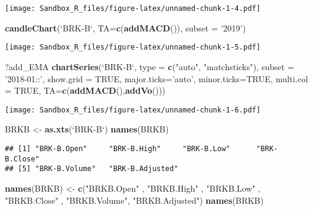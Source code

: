 \documentclass[]{article}
\newenvironment{Shaded}{\begin{snugshade}}{\end{snugshade}}
\newcommand{\KeywordTok}[1]{\textcolor[rgb]{0.13,0.29,0.53}{\textbf{#1}}}
\newcommand{\DataTypeTok}[1]{\textcolor[rgb]{0.13,0.29,0.53}{#1}}
\newcommand{\StringTok}[1]{\textcolor[rgb]{0.31,0.60,0.02}{#1}}
\newcommand{\OtherTok}[1]{\textcolor[rgb]{0.56,0.35,0.01}{#1}}
\newcommand{\NormalTok}[1]{#1}
\begin{document}
\texttt{[image: Sandbox\_R\_files/figure-latex/unnamed-chunk-1-4.pdf]}

\begin{Shaded}
\begin{Highlighting}[]
\KeywordTok{candleChart}\NormalTok{(}\StringTok{`}\DataTypeTok{BRK-B}\StringTok{`}\NormalTok{, }\DataTypeTok{TA=}\KeywordTok{c}\NormalTok{(}\KeywordTok{addMACD}\NormalTok{()), }\DataTypeTok{subset =} \StringTok{'2019'}\NormalTok{)}
\end{Highlighting}
\end{Shaded}

\texttt{[image: Sandbox\_R\_files/figure-latex/unnamed-chunk-1-5.pdf]}

\begin{Shaded}
\begin{Highlighting}[]
\NormalTok{?add_EMA}
\KeywordTok{chartSeries}\NormalTok{(}\StringTok{`}\DataTypeTok{BRK-B}\StringTok{`}\NormalTok{, }
            \DataTypeTok{type =} \KeywordTok{c}\NormalTok{(}\StringTok{"auto"}\NormalTok{, }\StringTok{"matchsticks"}\NormalTok{), }
            \DataTypeTok{subset =} \StringTok{'2018-01::'}\NormalTok{,}
            \DataTypeTok{show.grid =} \OtherTok{TRUE}\NormalTok{,}
            \DataTypeTok{major.ticks=}\StringTok{'auto'}\NormalTok{, }\DataTypeTok{minor.ticks=}\OtherTok{TRUE}\NormalTok{,}
            \DataTypeTok{multi.col =} \OtherTok{TRUE}\NormalTok{,}
            \DataTypeTok{TA=}\KeywordTok{c}\NormalTok{(}\KeywordTok{addMACD}\NormalTok{(),}\KeywordTok{addVo}\NormalTok{()))}
\end{Highlighting}
\end{Shaded}

\texttt{[image: Sandbox\_R\_files/figure-latex/unnamed-chunk-1-6.pdf]}

\begin{Shaded}
\begin{Highlighting}[]
\NormalTok{BRKB <-}\StringTok{ }\KeywordTok{as.xts}\NormalTok{(}\StringTok{`}\DataTypeTok{BRK-B}\StringTok{`}\NormalTok{)}
\KeywordTok{names}\NormalTok{(BRKB)}
\end{Highlighting}
\end{Shaded}

\begin{verbatim}
## [1] "BRK-B.Open"     "BRK-B.High"     "BRK-B.Low"      "BRK-B.Close"   
## [5] "BRK-B.Volume"   "BRK-B.Adjusted"
\end{verbatim}

\begin{Shaded}
\begin{Highlighting}[]
\KeywordTok{names}\NormalTok{(BRKB) <-}\StringTok{ }\KeywordTok{c}\NormalTok{(}\StringTok{"BRKB.Open"}\NormalTok{   ,  }\StringTok{"BRKB.High"}\NormalTok{   ,  }\StringTok{"BRKB.Low"}\NormalTok{   ,   }\StringTok{"BRKB.Close"}\NormalTok{  ,  }\StringTok{"BRKB.Volume"}\NormalTok{,  }\StringTok{"BRKB.Adjusted"}\NormalTok{)}
\KeywordTok{names}\NormalTok{(BRKB)}
\end{Highlighting}
\end{Shaded}
\end{document}
